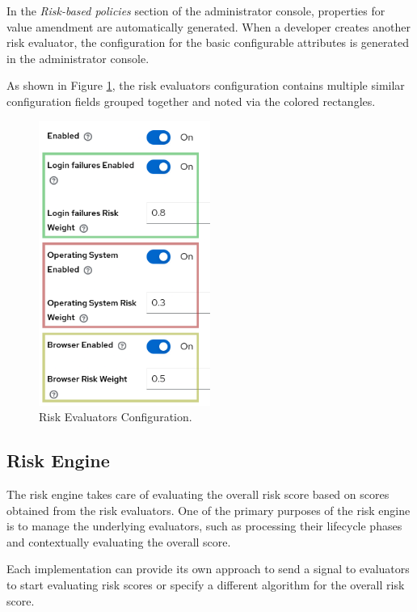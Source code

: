 In the \textit{Risk-based policies} section of the administrator console, properties for value amendment are automatically generated.
When a developer creates another risk evaluator, the configuration for the basic configurable attributes is generated in the administrator console.

As shown in Figure \ref{fig:risk-based-evaluator-config}, the risk evaluators configuration contains multiple similar configuration fields grouped together and noted via the colored rectangles. 

\begin{figure}[htbp]
  \centering
  \includegraphics[width=0.5\textwidth]{img/sections/5-design/risk-evaluators-config.png}
  \caption{Risk Evaluators Configuration.}
  \label{fig:risk-based-evaluator-config}
\end{figure}

\newpage
\subsection{Risk Engine} \label{risk-engine}
The risk engine takes care of evaluating the overall risk score based on scores obtained from the risk evaluators.
One of the primary purposes of the risk engine is to manage the underlying evaluators, such as processing their lifecycle phases and contextually evaluating the overall score.

Each implementation can provide its own approach to send a signal to evaluators to start evaluating risk scores or specify a different algorithm for the overall risk score.

